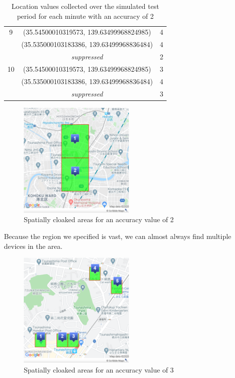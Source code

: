 \begin{table}[htbp]
\begin{tabular}{|c|c|c|}
        \hline
        9 & (35.54500010319573, 139.63499968824985) & 4 \\ 
        & (35.535000103183386, 139.63499968836484) & 4 \\ 
        &\textit{suppressed} & 2 \\ 
        \hline
        10 & (35.54500010319573, 139.63499968824985) & 3 \\ 
        & (35.535000103183386, 139.63499968836484) & 4 \\ 
        &\textit{suppressed} & 3 \\ 
        \hline
    \end{tabular}
    \caption{Location values collected over the simulated test period for each minute with an accuracy of 2}
    \label{tab:location_sim2}
\end{table}

\begin{figure}[htbp]
  \centering
  \includegraphics[width=0.5\textwidth]{figures/acc2}
  \caption{Spatially cloaked areas for an accuracy value of 2} \label{fig:acc2}
\end{figure}

Because the region we specified is vast, we can almost always find multiple devices in the area.

\begin{figure}[htbp]
  \centering
  \includegraphics[width=0.5\textwidth]{figures/acc3}
  \caption{Spatially cloaked areas for an accuracy value of 3} \label{fig:acc3}
\end{figure}

